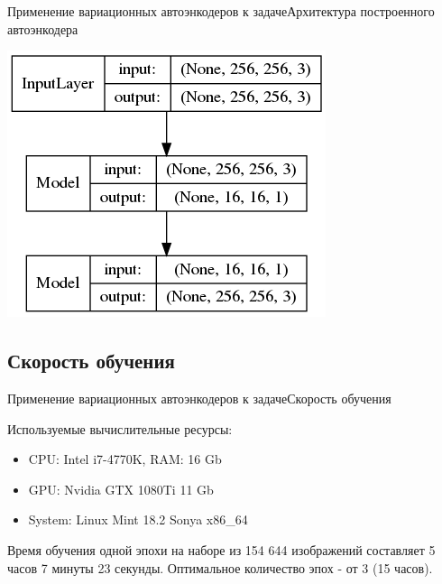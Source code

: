 \documentclass{beamer}
\begin{document}
\begin{frame}{Применение вариационных автоэнкодеров к задаче}{Архитектура построенного автоэнкодера}
\begin{minipage}{0.1\textwidth}
\begin{center}
	\end{center}
\end{minipage}
\hfill
\begin{minipage}{0.4\textwidth}
	\begin{flushleft}
		\includegraphics[scale=0.35]{autoencoder}
	\end{flushleft}
\end{minipage}

\end{frame}

\subsection{Скорость обучения}

\begin{frame}{Применение вариационных автоэнкодеров к задаче}{Скорость обучения}

\begin{figure}[t]
	\label{fig:vae}
\end{figure}

Используемые вычислительные ресурсы:
\begin{itemize}
	\item CPU: Intel i7-4770K, RAM: 16 Gb
	\item GPU: Nvidia GTX 1080Ti 11 Gb
	\item System: Linux Mint 18.2 Sonya x86\_64 
\end{itemize}

Время обучения одной эпохи на наборе из 154 644 изображений составляет 5 часов 7 минуты 23 секунды.
Оптимальное количество эпох - от 3 (15 часов).

\end{frame}
\end{document}
